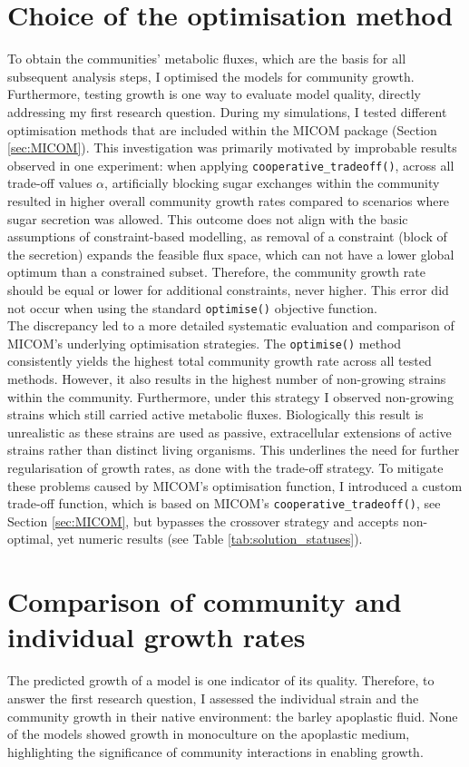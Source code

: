 \section{Choice of the optimisation method}
To obtain the communities’ metabolic fluxes, which are the basis for all subsequent analysis steps, I optimised the models for community growth. Furthermore, testing growth is one way to evaluate model quality, directly addressing my first research question. During my simulations, I tested different optimisation methods that are included within the MICOM package (Section \ref{sec:MICOM}). This investigation was primarily motivated by improbable results observed in one experiment: when applying \texttt{cooperative\_tradeoff()}, across all trade-off values $\alpha$, artificially blocking sugar exchanges within the community resulted in higher overall community growth rates compared to scenarios where sugar secretion was allowed. This outcome does not align with the basic assumptions of constraint-based modelling, as removal of a constraint (block of the secretion) expands the feasible flux space, which can not have a lower global optimum than a constrained subset. Therefore, the community growth rate should be equal or lower for additional constraints, never higher. This error did not occur when using the standard \texttt{optimise()} objective function. 
\\


The discrepancy led to a more detailed systematic evaluation and comparison of MICOM's underlying optimisation strategies. The \texttt{optimise()} method consistently yields the highest total community growth rate across all tested methods. However, it also results in the highest number of non-growing strains within the community. Furthermore, under this strategy I observed non-growing strains which still carried active metabolic fluxes. Biologically this result is unrealistic as these strains are used as passive, extracellular extensions of active strains rather than distinct living organisms. This underlines the need for further regularisation of growth rates, as done with the trade-off strategy. 
To mitigate these problems caused by MICOM’s optimisation function, I introduced a custom trade-off function, which is based on MICOM's \texttt{cooperative\_tradeoff()}, see Section \ref{sec:MICOM}, but bypasses the crossover strategy and accepts non-optimal, yet numeric results (see Table \ref{tab:solution_statuses}). 


\section{Comparison of community and individual growth rates}
The predicted growth of a model is one indicator of its quality. Therefore, to answer the first research question, I assessed the individual strain and the community growth in their native environment: the barley apoplastic fluid. None of the models showed growth in monoculture on the apoplastic medium, highlighting the significance of community interactions in enabling growth. 
\\


